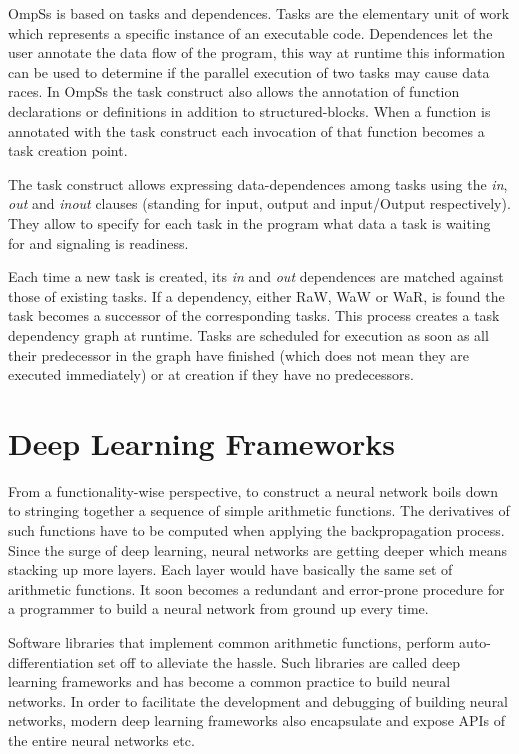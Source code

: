 OmpSs is based on tasks and dependences. Tasks are the elementary unit of work 
which represents a specific instance of an executable code. Dependences let the 
user annotate the data flow of the program, this way at runtime this information 
can be used to determine if the parallel execution of two tasks may cause data races.
In OmpSs the task construct also allows the annotation of function declarations or 
definitions in addition to structured-blocks. When a function is annotated with the 
task construct each invocation of that function becomes a task creation point.

The task construct allows expressing data-dependences among tasks using the 
\textit{in}, \textit{out} and \textit{inout} clauses (standing for input, output 
and input/Output respectively). They allow to specify for each task in the program 
what data a task is waiting for and signaling is readiness.

Each time a new task is created, its \textit{in} and \textit{out} dependences are 
matched against those of existing tasks. If a dependency, either RaW, WaW or WaR, 
is found the task becomes a successor of the corresponding tasks. This process 
creates a task dependency graph at runtime. Tasks are scheduled for execution as 
soon as all their predecessor in the graph have finished (which does not mean they 
are executed immediately) or at creation if they have no predecessors.

\section{Deep Learning Frameworks}
From a functionality-wise perspective, to construct a neural network boils down 
to stringing together a sequence of simple arithmetic functions. The derivatives
of such functions have to be computed when applying the backpropagation process.
Since the surge of deep learning, neural networks are getting deeper which means 
stacking up more layers. Each layer would have basically the same set of 
arithmetic functions. It soon becomes a redundant and error-prone procedure for 
a programmer to build a neural network from ground up every time. 

Software libraries that implement common arithmetic functions, perform auto-differentiation 
set off to alleviate the hassle. Such libraries are called deep learning frameworks 
and has become a common practice to build neural networks. In order to 
facilitate the development and debugging of building neural networks,
modern deep learning frameworks also encapsulate and expose APIs of the entire 
neural networks etc.

